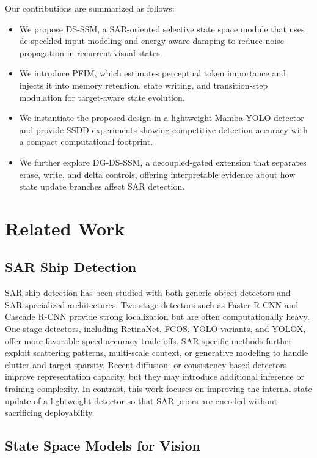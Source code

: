 \documentclass[letterpaper]{article}
\begin{document}
Our contributions are summarized as follows:
\begin{itemize}
  \item We propose DS-SSM, a SAR-oriented selective state space module that uses de-speckled input modeling and energy-aware damping to reduce noise propagation in recurrent visual states.
  \item We introduce PFIM, which estimates perceptual token importance and injects it into memory retention, state writing, and transition-step modulation for target-aware state evolution.
  \item We instantiate the proposed design in a lightweight Mamba-YOLO detector and provide SSDD experiments showing competitive detection accuracy with a compact computational footprint.
  \item We further explore DG-DS-SSM, a decoupled-gated extension that separates erase, write, and delta controls, offering interpretable evidence about how state update branches affect SAR detection.
\end{itemize}

\section{Related Work}

\subsection{SAR Ship Detection}

SAR ship detection has been studied with both generic object detectors and SAR-specialized architectures. Two-stage detectors such as Faster R-CNN and Cascade R-CNN provide strong localization but are often computationally heavy. One-stage detectors, including RetinaNet, FCOS, YOLO variants, and YOLOX, offer more favorable speed-accuracy trade-offs. SAR-specific methods further exploit scattering patterns, multi-scale context, or generative modeling to handle clutter and target sparsity. Recent diffusion- or consistency-based detectors improve representation capacity, but they may introduce additional inference or training complexity. In contrast, this work focuses on improving the internal state update of a lightweight detector so that SAR priors are encoded without sacrificing deployability.

\subsection{State Space Models for Vision}
\end{document}
